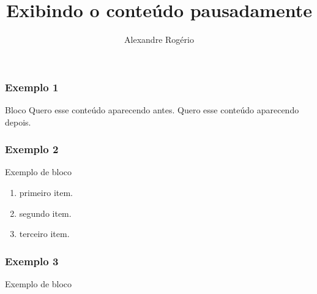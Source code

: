 \documentclass[14pt]{beamer}
\begin{document}
	\author{Alexandre Rogério}
	\title{Exibindo o conteúdo pausadamente}
	\begin{frame}[plain]
	\maketitle
\end{frame}

\begin{frame}
\frametitle{Exemplo 1}
\transboxin
\begin{block}{Bloco}
	Quero esse conteúdo aparecendo antes. \pause
	Quero esse conteúdo aparecendo depois.
\end{block}
\end{frame}

\begin{frame}
\frametitle{Exemplo 2}
\begin{block}{Exemplo de bloco}
	\begin{enumerate}[<+->]
		\item primeiro item.
		\item segundo item.
		\item terceiro item.
	\end{enumerate}
\end{block}
\end{frame}

\begin{frame}
\frametitle{Exemplo 3}
\begin{block}{Exemplo de bloco}
	\begin{itemize}
	\end{itemize}
\end{block}
\end{frame}
\end{document}
